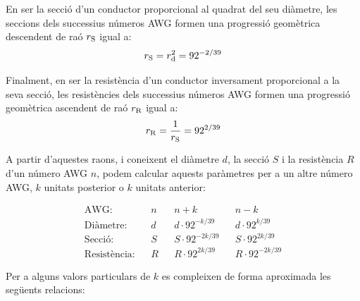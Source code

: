 En ser la secci\'{o} d'un conductor proporcional al quadrat del seu di\`{a}metre, les seccions dels successius n\'{u}meros AWG formen una progressi\'{o} geom\`{e}trica  descendent de ra\'{o} $r_\mathrm{S}$ igual a: \begin{equation}
   r_\mathrm{S} = r_\mathrm{d}^2 = 92^{-2/39}
\end{equation}

Finalment, en ser la resist\`{e}ncia d'un conductor inversament proporcional a la seva secci\'{o}, les resist\`{e}ncies dels successius n\'{u}meros AWG formen una progressi\'{o} geom\`{e}trica ascendent de ra\'{o} $r_\mathrm{R}$ igual a:
\begin{equation}
   r_\mathrm{R} = \frac{1}{r_\mathrm{S}} = 92^{2/39}
\end{equation}

A partir d'aquestes raons, i coneixent el di\`{a}metre $d$, la secci\'{o} $S$ i la resist\`{e}ncia $R$ d'un n\'{u}mero AWG $n$, podem calcular aquests par\`{a}metres per a un altre n\'{u}mero AWG, $k$ unitats posterior o $k$ unitats anterior:

\begin{equation}
   \begin{array}{rllllll}
     \text{AWG:}         & & n & & n+k                & & n-k \\
     \text{Di\`{a}metre:}    & & d & & d\cdot 92^{-k/39}  & & d\cdot 92^{k/39} \\
     \text{Secci\'{o}:}      & & S & & S\cdot 92^{-2k/39} & & S\cdot 92^{2k/39} \\
     \text{Resist\`{e}ncia:} & & R & & R\cdot 92^{2k/39}  & & R\cdot 92^{-2k/39}
   \end{array}
\end{equation}

Per a alguns valors particulars de $k$ es compleixen de forma aproximada les seg\"{u}ents relacions:


